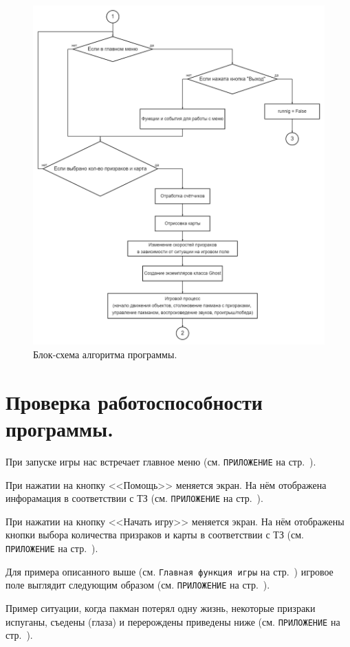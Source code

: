 \begin{figure}[H]
	\centering
	\includegraphics[width=1\linewidth]{images/flow2.png}
	\caption{Блок-схема алгоритма программы.}
	\label{fig8}
\end{figure}

\section{\label{sec:ch02/sec02}Проверка работоспособности программы.}
При запуске игры нас встречает главное меню (см. \texttt{ПРИЛОЖЕНИЕ} на стр.~\pageref{fig2}).

При нажатии на кнопку <<Помощь>> меняется экран. На нём отображена инфорамация в соответствии с ТЗ (см. \texttt{ПРИЛОЖЕНИЕ} на стр.~\pageref{fig3}).

При нажатии на кнопку <<Начать игру>> меняется экран. На нём отображены кнопки выбора количества призраков и карты в соответствии с ТЗ (см. \texttt{ПРИЛОЖЕНИЕ} на стр.~\pageref{fig4}).

Для примера описанного выше (см. \texttt{Главная функция игры} на стр.~\pageref{subsec:ch02/sec01/sub07}) игровое поле выглядит следующим образом (см. \texttt{ПРИЛОЖЕНИЕ} на стр.~\pageref{fig5}).

Пример ситуации, когда пакман потерял одну жизнь, некоторые призраки испуганы, съедены (глаза) и перерождены приведены ниже (см. \texttt{ПРИЛОЖЕНИЕ} на стр.~\pageref{fig6}).